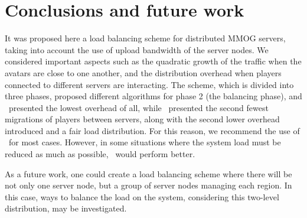 \section{Conclusions and future work}

It was proposed here a load balancing scheme for distributed MMOG servers, taking into account the use of upload bandwidth of the server nodes. We considered important aspects such as the quadratic growth of the traffic when the avatars are close to one another, and the distribution overhead when players connected to different servers are interacting. The scheme, which is divided into three phases, proposed different algorithms for phase 2 (the balancing phase), and \ggp\ presented the lowest overhead of all, while \ggpf\ presented the second fewest migrations of players between servers, along with the second lower overhead introduced and a fair load distribution. For this reason, we recommend the use of \ggpf\ for most cases. However, in some situations where the system load must be reduced as much as possible, \ggp\ would perform better.

As a future work, %
one could create a load balancing scheme where there will be not only one server node, but a group of server nodes managing each region. In this case, ways to balance the load on the system, considering this two-level distribution, may be investigated.

